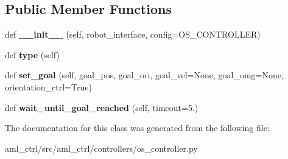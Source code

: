 \subsection*{Public Member Functions}
\begin{DoxyCompactItemize}
\item 
\hypertarget{classaml__ctrl_1_1controllers_1_1os__controller_1_1_o_s_controller_a535fdd714a6b1fc1df9b1c192397a29e}{}\label{classaml__ctrl_1_1controllers_1_1os__controller_1_1_o_s_controller_a535fdd714a6b1fc1df9b1c192397a29e} 
def {\bfseries \+\_\+\+\_\+init\+\_\+\+\_\+} (self, robot\+\_\+interface, config=O\+S\+\_\+\+C\+O\+N\+T\+R\+O\+L\+L\+ER)
\item 
\hypertarget{classaml__ctrl_1_1controllers_1_1os__controller_1_1_o_s_controller_a827eb86c2c324989c0b677cd33490a30}{}\label{classaml__ctrl_1_1controllers_1_1os__controller_1_1_o_s_controller_a827eb86c2c324989c0b677cd33490a30} 
def {\bfseries type} (self)
\item 
\hypertarget{classaml__ctrl_1_1controllers_1_1os__controller_1_1_o_s_controller_a4af5a3718755478f81daa8e6b0faba69}{}\label{classaml__ctrl_1_1controllers_1_1os__controller_1_1_o_s_controller_a4af5a3718755478f81daa8e6b0faba69} 
def {\bfseries set\+\_\+goal} (self, goal\+\_\+pos, goal\+\_\+ori, goal\+\_\+vel=None, goal\+\_\+omg=None, orientation\+\_\+ctrl=True)
\item 
\hypertarget{classaml__ctrl_1_1controllers_1_1os__controller_1_1_o_s_controller_a3d0b4bd67eeeae19d0fbb9b61e826be0}{}\label{classaml__ctrl_1_1controllers_1_1os__controller_1_1_o_s_controller_a3d0b4bd67eeeae19d0fbb9b61e826be0} 
def {\bfseries wait\+\_\+until\+\_\+goal\+\_\+reached} (self, timeout=5.)
\end{DoxyCompactItemize}


The documentation for this class was generated from the following file\+:\begin{DoxyCompactItemize}
\item 
aml\+\_\+ctrl/src/aml\+\_\+ctrl/controllers/os\+\_\+controller.\+py\end{DoxyCompactItemize}
